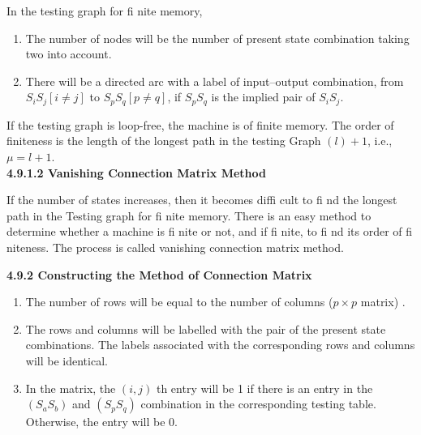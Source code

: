 \documentclass[10pt]{article}
\begin{document}
In the testing graph for fi nite memory,\\


\begin{enumerate}
  \item The number of nodes will be the number of present state combination taking two into account.\\
  \item There will be a directed arc with a label of input–output combination, from $S_iS_j [i \neq j]$ to $S_pS_q
[p \neq q]$, if $S_pS_q$ is the implied pair of $S_iS_j$.\\
\end{enumerate}

\vspace*{0.2cm}
\hspace{0.5cm} If the testing graph is loop-free, the machine is of finite memory. The order of finiteness is the length
of the longest path in the testing Graph $(l) + 1$, i.e., $\mu = l + 1$.\\

\vspace*{0.4cm}
\large{
\textbf{4.9.1.2 Vanishing Connection Matrix Method}\\
}

\vspace*{0.2cm}

If the number of states increases, then it becomes diffi cult to fi nd the longest path in the Testing graph
for fi nite memory. There is an easy method to determine whether a machine is fi nite or not, and if fi nite,
to fi nd its order of fi niteness. The process is called vanishing connection matrix method.\\


\vspace*{0.4cm}

\large{
\textbf{4.9.2 Constructing the Method of Connection Matrix}\\
}

\vspace*{0.2cm}

\begin{enumerate}
  \item The number of rows will be equal to the number of columns ($p \times p$ matrix) .\\
  \item The rows and columns will be labelled with the pair of the present state combinations. The labels
associated with the corresponding rows and columns will be identical.\\
  \item In the matrix, the $(i, j)$ th entry will be 1 if there is an entry in the $(S_aS_b)$ and $(S_pS_q)$ combination in
the corresponding testing table. Otherwise, the entry will be 0.\\
\end{enumerate}
\end{document}
